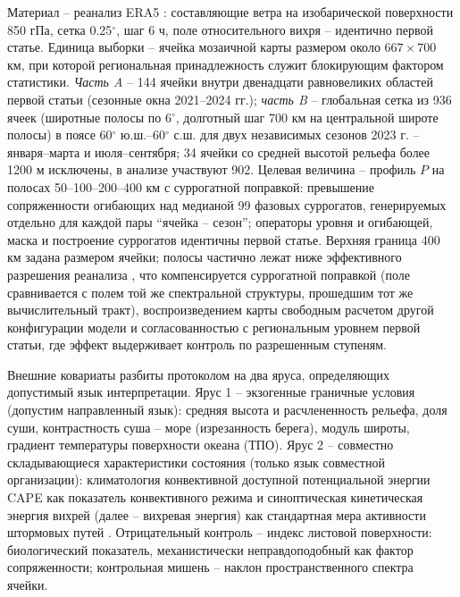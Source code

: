 \documentclass[12pt,a4paper]{article}
\begin{document}
Материал -- реанализ ERA5 \cite{Hersbach2020,Soci2024}: составляющие ветра на изобарической поверхности 850 гПа, сетка 0.25$^\circ$, шаг 6 ч, поле относительного вихря -- идентично первой статье. Единица выборки -- ячейка мозаичной карты размером около $667 \times 700$ км, при которой региональная принадлежность служит блокирующим фактором статистики. \emph{Часть A} -- 144 ячейки внутри двенадцати равновеликих областей первой статьи (сезонные окна 2021--2024 гг.); \emph{часть B} -- глобальная сетка из 936 ячеек (широтные полосы по 6$^\circ$, долготный шаг 700 км на центральной широте полосы) в поясе 60$^\circ$ ю.ш.--60$^\circ$ с.ш. для двух независимых сезонов 2023 г. -- января--марта и июля--сентября; 34 ячейки со средней высотой рельефа более 1200 м исключены, в анализе участвуют 902. Целевая величина -- профиль $P$ на полосах 50--100--200--400 км с суррогатной поправкой: превышение сопряженности огибающих над медианой 99 фазовых суррогатов, генерируемых отдельно для каждой пары “ячейка -- сезон”; операторы уровня и огибающей, маска и построение суррогатов идентичны первой статье. Верхняя граница 400 км задана размером ячейки; полосы частично лежат ниже эффективного разрешения реанализа \cite{Skamarock2004,Bolgiani2022}, что компенсируется суррогатной поправкой (поле сравнивается с полем той же спектральной структуры, прошедшим тот же вычислительный тракт), воспроизведением карты свободным расчетом другой конфигурации модели и согласованностью с региональным уровнем первой статьи, где эффект выдерживает контроль по разрешенным ступеням.

Внешние ковариаты разбиты протоколом на два яруса, определяющих допустимый язык интерпретации. Ярус 1 -- экзогенные граничные условия (допустим направленный язык): средняя высота и расчлененность рельефа, доля суши, контрастность суша -- море (изрезанность берега), модуль широты, градиент температуры поверхности океана (ТПО). Ярус 2 -- совместно складывающиеся характеристики состояния (только язык совместной организации): климатология конвективной доступной потенциальной энергии CAPE \cite{RiemannCampe2009} как показатель конвективного режима и синоптическая кинетическая энергия вихрей (далее -- вихревая энергия) как стандартная мера активности штормовых путей \cite{Blackmon1976,HoskinsHodges2019}. Отрицательный контроль -- индекс листовой поверхности: биологический показатель, механистически неправдоподобный как фактор сопряженности; контрольная мишень -- наклон пространственного спектра ячейки.
\end{document}
